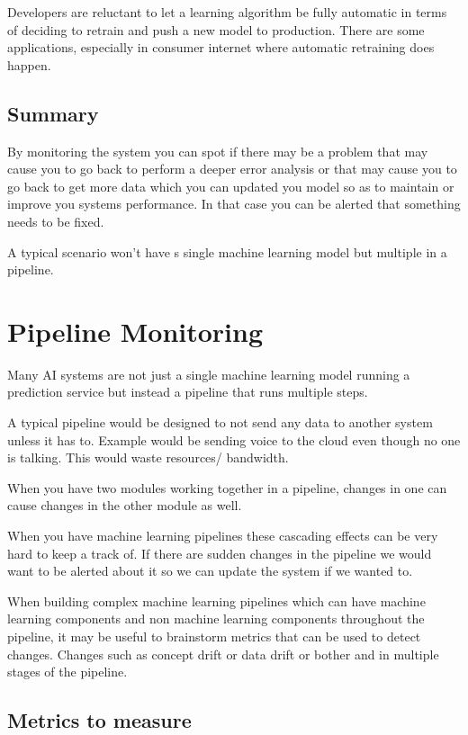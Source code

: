 Developers are reluctant to let a learning algorithm be fully automatic in terms of deciding to retrain and push a new model to production.
There are some applications, especially in consumer internet where automatic retraining does happen.

\subsection{Summary}
By monitoring the system you can spot if there may be a problem that may cause you to go back to perform a deeper error analysis or that may cause you to go back to get more data which you can updated you model so as to maintain or improve you systems performance.
In that case you can be alerted that something needs to be fixed.

A typical scenario won't have s single machine learning model but multiple in a pipeline.

\section{Pipeline Monitoring}

Many AI systems are not just a single machine learning model running a prediction service but instead a pipeline that runs multiple steps.

A typical pipeline would be designed to not send any data to another system unless it has to.
Example would be sending voice to the cloud even though no one is talking.
This would waste resources/ bandwidth.

When you have two modules working together in a pipeline, changes in one can cause changes in the other module as well.

When you have machine learning pipelines these cascading effects can be very hard to keep a track of.
If there are sudden changes in the pipeline we would want to be alerted about it so we can update the system if we wanted to.

When building complex machine learning pipelines which can have machine learning components and non machine learning components throughout the pipeline, it may be useful to brainstorm metrics that can be used to detect changes.
Changes such as concept drift or data drift or bother and in multiple stages of the pipeline.

\subsection{Metrics to measure}

